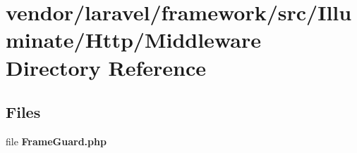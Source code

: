 \section{vendor/laravel/framework/src/\+Illuminate/\+Http/\+Middleware Directory Reference}
\label{dir_987f6773bfbf8da0bf31d5f1439539bb}
\subsection*{Files}
\begin{DoxyCompactItemize}
\item 
file {\bf Frame\+Guard.\+php}
\end{DoxyCompactItemize}
